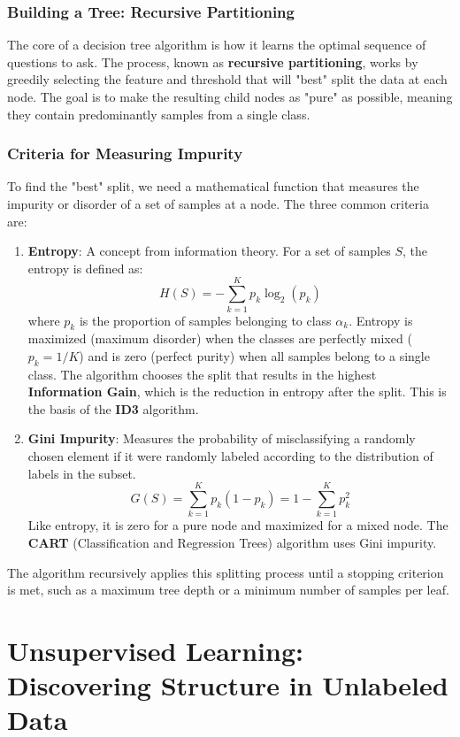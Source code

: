 \subsection*{Building a Tree: Recursive Partitioning}
The core of a decision tree algorithm is how it learns the optimal sequence of questions to ask. The process, known as \textbf{recursive partitioning}, works by greedily selecting the feature and threshold that will "best" split the data at each node. The goal is to make the resulting child nodes as "pure" as possible, meaning they contain predominantly samples from a single class.

\subsection*{Criteria for Measuring Impurity}
To find the "best" split, we need a mathematical function that measures the impurity or disorder of a set of samples at a node. The three common criteria are:
\begin{enumerate}
    \item \textbf{Entropy}: A concept from information theory. For a set of samples $S$, the entropy is defined as:
    $$ H(S) = -\sum_{k=1}^{K} p_k \log_2(p_k) $$
    where $p_k$ is the proportion of samples belonging to class $\alpha_k$. Entropy is maximized (maximum disorder) when the classes are perfectly mixed ($p_k = 1/K$) and is zero (perfect purity) when all samples belong to a single class. The algorithm chooses the split that results in the highest \textbf{Information Gain}, which is the reduction in entropy after the split. This is the basis of the \textbf{ID3} algorithm.
    
    \item \textbf{Gini Impurity}: Measures the probability of misclassifying a randomly chosen element if it were randomly labeled according to the distribution of labels in the subset.
    $$ G(S) = \sum_{k=1}^{K} p_k (1 - p_k) = 1 - \sum_{k=1}^{K} p_k^2 $$
    Like entropy, it is zero for a pure node and maximized for a mixed node. The \textbf{CART} (Classification and Regression Trees) algorithm uses Gini impurity.
\end{enumerate}
The algorithm recursively applies this splitting process until a stopping criterion is met, such as a maximum tree depth or a minimum number of samples per leaf.

\chapter*{Unsupervised Learning: Discovering Structure in Unlabeled Data}
\label{chap:unsupervised_learning}

